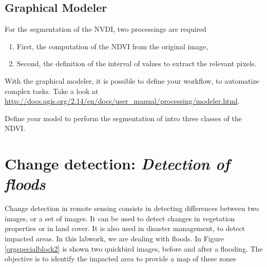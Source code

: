\documentclass[a4paper,11pt,DIV=18]{scrartcl}
\begin{document}
\subsection{Graphical Modeler}
\label{sec:orgheadline23}
For the segmentation of the NVDI, two processings are required
\begin{enumerate}
\item First, the computation of the NDVI from the original image,
\item Second,  the definition of  the interval  of values to  extract the
relevant pixels.
\end{enumerate}
With the graphical modeler, it is possible to define your workflow, to
automatize      complex      tasks.      Take      a      look      at
\url{http://docs.qgis.org/2.14/en/docs/user_manual/processing/modeler.html}.  

\begin{work}
Define your model  to perform the segmentation of  intro three classes
of the NDVI.
\end{work}
\section{Change detection: \emph{Detection of floods}}
\label{sec:orgheadline26}
Change detection  in remote sensing consists  in detecting differences
between two  images, or  a set of  images.  It can  be used  to detect
changes in vegetation properties or in land cover.  It is also used in
disaster management, to detect impacted areas. In this labwork, we are
dealing with floods.  In Figure  \ref{orgspecialblock2} is shown two quickbird images,
before  and  after a  flooding.   The  objective  is to  identify  the
impacted area to provide a map of these zones
\end{document}
